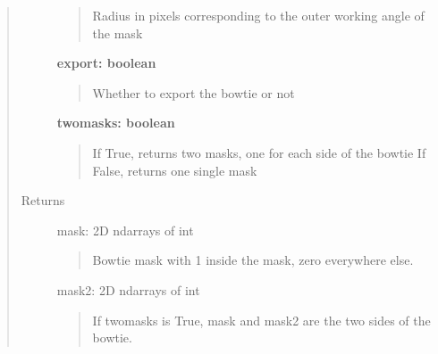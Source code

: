 \documentclass[letterpaper,10pt,english]{sphinxmanual}
\begin{document}
\begin{fulllineitems}
\begin{quote}
\begin{description}
\begin{quote}
Radius in pixels corresponding to the outer working angle of the mask
\end{quote}

\textbf{export: boolean}
\begin{quote}

Whether to export the bowtie or not
\end{quote}

\textbf{twomasks: boolean}
\begin{quote}

If True, returns two masks, one for each side of the bowtie
If False, returns one single mask
\end{quote}

\item[{Returns}] \leavevmode
mask: 2D ndarrays of int
\begin{quote}

Bowtie mask with 1 inside the mask, zero everywhere else.
\end{quote}

mask2: 2D ndarrays of int
\begin{quote}

If twomasks is True, mask and mask2 are the two sides of the bowtie.
\end{quote}

\end{description}\end{quote}

\end{fulllineitems}

\end{document}

